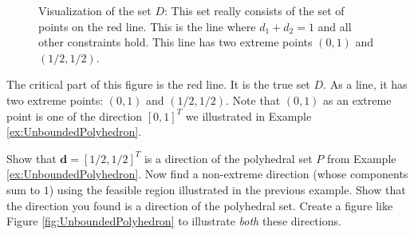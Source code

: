 \begin{example}
\begin{figure}[htbp]
\caption{Visualization of the set $D$: This set really consists of the set of points on the red line. This is the line where $d_1 + d_2 = 1$ and all other constraints hold. This line has two extreme points $(0,1)$ and $(1/2,1/2)$.}
\label{fig:DExtreme}
\end{figure}
The critical part of this figure is the red line. It is the true set $D$. As a line, it has two extreme points: $(0,1)$ and $(1/2,1/2)$. Note that $(0,1)$ as an extreme point is one of the direction $[0,1]^T$ we illustrated in Example \ref{ex:UnboundedPolyhedron}.
\end{example}

\begin{exercise} Show that $\mathbf{d} = [1/2,1/2]^T$ is a direction of the polyhedral set $P$ from Example \ref{ex:UnboundedPolyhedron}. Now find a non-extreme direction (whose components sum to $1$) using the feasible region illustrated in the previous example. Show that the direction you found is a direction of the polyhedral set. Create a figure like Figure \ref{fig:UnboundedPolyhedron} to illustrate \textit{both} these directions.
\end{exercise}

